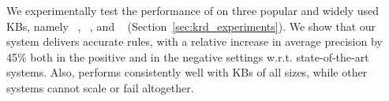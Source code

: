 We experimentally test the performance of %
\krd %
on  three popular and widely used KBs, namely \dbpedia~\cite{bizer2009dbpedia}, \yago~\cite{suchanek2007yago}, and \wikidata~\cite{vrandevcic2014wikidata} (Section~\ref{sec:krd_experiments}). 
We show that our system
delivers accurate rules, 
with a relative increase in average precision by 45\% both in the positive and in the negative settings w.r.t. state-of-the-art systems.
Also, \krd performs consistently well with KBs of all sizes, while other systems cannot scale or fail altogether. %




